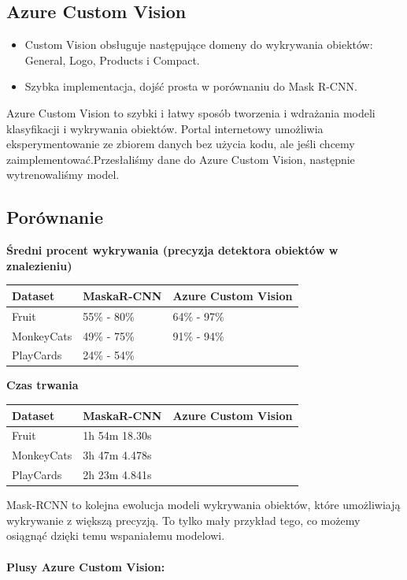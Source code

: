\documentclass[11pt]{article}
\providecommand{\tightlist}{%
      \setlength{\itemsep}{0pt}\setlength{\parskip}{0pt}}
\begin{document}
\hypertarget{azure-custom-vision}{%
\subsection{Azure Custom Vision}\label{azure-custom-vision}}

\begin{itemize}
\tightlist
\item
  Custom Vision obsługuje następujące domeny do wykrywania obiektów:
  General, Logo, Products i Compact.
\item
  Szybka implementacja, dojść prosta w porównaniu do Mask R-CNN.
\end{itemize}

Azure Custom Vision to szybki i łatwy sposób tworzenia i wdrażania
modeli klasyfikacji i wykrywania obiektów. Portal internetowy umożliwia
eksperymentowanie ze zbiorem danych bez użycia kodu, ale jeśli chcemy
zaimplementować.Przesłaliśmy dane do Azure Custom Vision, następnie
wytrenowaliśmy model.

\hypertarget{poruxf3wnanie}{%
\subsection{Porównanie}\label{poruxf3wnanie}}

\textbf{Średni procent wykrywania (precyzja detektora obiektów w
znalezieniu)}

\begin{longtable}[]{@{}lll@{}}
\toprule
Dataset & MaskaR-CNN & Azure Custom Vision\tabularnewline
\midrule
\endhead
Fruit & 55\% - 80\% & 64\% - 97\%\tabularnewline
MonkeyCats & 49\% - 75\% & 91\% - 94\%\tabularnewline
PlayCards & 24\% - 54\% &\tabularnewline
\bottomrule
\end{longtable}

\textbf{Czas trwania}

\begin{longtable}[]{@{}lll@{}}
\toprule
Dataset & MaskaR-CNN & Azure Custom Vision\tabularnewline
\midrule
\endhead
Fruit & 1h 54m 18.30s &\tabularnewline
MonkeyCats & 3h 47m 4.478s &\tabularnewline
PlayCards & 2h 23m 4.841s &\tabularnewline
\bottomrule
\end{longtable}

Mask-RCNN to kolejna ewolucja modeli wykrywania obiektów, które
umożliwiają wykrywanie z większą precyzją. To tylko mały przykład tego,
co możemy osiągnąć dzięki temu wspaniałemu modelowi.

\hypertarget{plusy-azure-custom-vision}{%
\paragraph{Plusy Azure Custom Vision:}\label{plusy-azure-custom-vision}}
\end{document}

